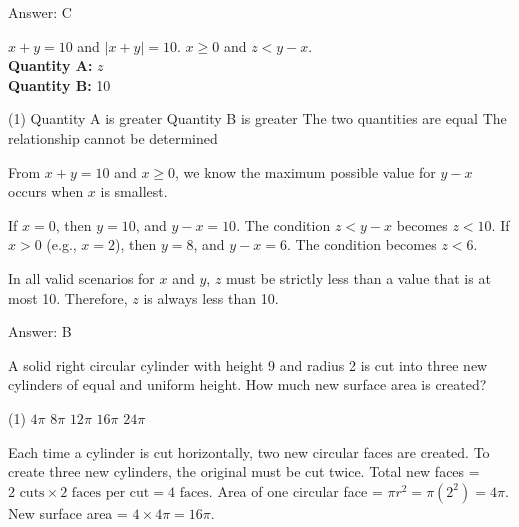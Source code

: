 \documentclass[11pt,paper=a4,answers]{exam}
\begin{document}
\begin{questions}
\begin{solution}
Answer: \colorbox{yellow!100}{C}
\end{solution}

\vspace{1cm}

\question
$x + y = 10$ and $|x + y| = 10$. $x \geq 0$ and $z < y - x$.
\vspace{5pt}\\
\textbf{Quantity A: } $z$ \\
\vspace{5pt}
\textbf{Quantity B: } 10

\begin{tasks}(1)
\task[A)] Quantity A is greater
\task[B)] Quantity B is greater
\task[C)] The two quantities are equal
\task[D)] The relationship cannot be determined
\end{tasks}

\begin{solution}
From $x+y=10$ and $x \geq 0$, we know the maximum possible value for $y-x$ occurs when $x$ is smallest.
\vspace{5pt}
\begin{center}
If $x = 0$, then $y = 10$, and $y - x = 10$.
\vspace{5pt}
The condition $z < y - x$ becomes $z < 10$.
\vspace{5pt}
If $x > 0$ (e.g., $x=2$), then $y=8$, and $y - x = 6$. The condition becomes $z < 6$.
\end{center}
\vspace{5pt}
In all valid scenarios for $x$ and $y$, $z$ must be strictly less than a value that is at most 10.
\vspace{5pt}
Therefore, $z$ is always less than 10.

Answer: \colorbox{yellow!100}{B}
\end{solution}

\vspace{1cm}


\question
A solid right circular cylinder with height 9 and radius 2 is cut into three new cylinders of equal and uniform height. How much new surface area is created?

\begin{tasks}(1)
\task[A)] $4\pi$ \task[B)] $8\pi$ \task[C)] $12\pi$ \task[D)] $16\pi$ \task[E)] $24\pi$
\end{tasks}

\begin{solution}
\begin{center}
Each time a cylinder is cut horizontally, two new circular faces are created.
\vspace{5pt}
To create three new cylinders, the original must be cut twice.
\vspace{5pt}
Total new faces = $2 \text{ cuts} \times 2 \text{ faces per cut} = 4 \text{ faces}$.
\vspace{5pt}
Area of one circular face = $\pi r^2 = \pi (2^2) = 4\pi$.
\vspace{5pt}
New surface area = $4 \times 4\pi = 16\pi$.
\end{center}


\end{solution}
\end{questions}
\end{document}
